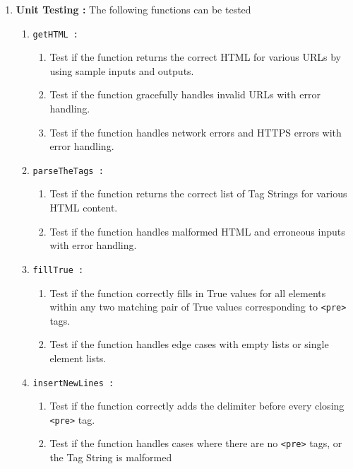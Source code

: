 \documentclass{scrreprt}
\begin{document}
\begin{enumerate}
    \item \textbf{Unit Testing : } The following functions can be tested 
    \begin{enumerate}
        \item \texttt{getHTML : }
        \begin{enumerate}
            \item Test if the function returns the correct HTML for various URLs by using sample inputs and outputs.
            \item Test if the function gracefully handles invalid URLs with error handling.
            \item Test if the function handles network errors and HTTPS errors with error handling.
        \end{enumerate}

        \item \texttt{parseTheTags : }
        \begin{enumerate}
            \item Test if the function returns the correct list of Tag Strings for various HTML content.
            \item Test if the function handles malformed HTML and erroneous inputs with error handling.
        \end{enumerate}

        \item \texttt{fillTrue : }
        \begin{enumerate}
            \item Test if the function correctly fills in True values for all elements within any two matching pair of True values corresponding to \texttt{<pre>} tags.
            \item Test if the function handles edge cases with empty lists or single element lists.
        \end{enumerate}

        \item \texttt{insertNewLines : }
        \begin{enumerate}
            \item Test if the function correctly adds the delimiter before every closing \texttt{<pre>} tag.
            \item Test if the function handles cases where there are no \texttt{<pre>} tags, or the Tag String is malformed 
        \end{enumerate}


\end{enumerate}
\end{enumerate}
\end{document}

